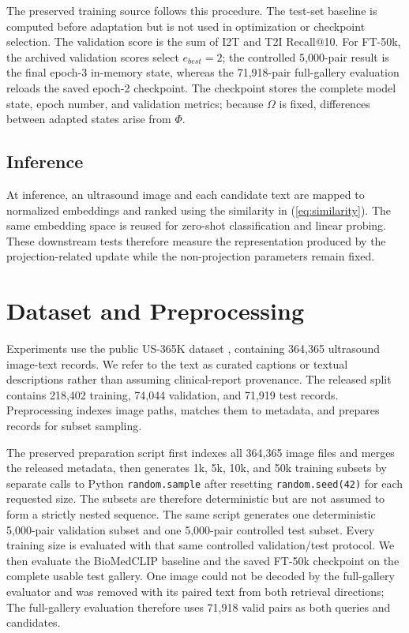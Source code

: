 \documentclass[runningheads]{llncs}
\begin{document}
The preserved training source follows this procedure. The test-set baseline is computed before adaptation but is not used in optimization or checkpoint selection. The validation score is the sum of I2T and T2I Recall@10. For FT-50k, the archived validation scores select $e_{best}=2$; the controlled 5,000-pair result is the final epoch-3 in-memory state, whereas the 71,918-pair full-gallery evaluation reloads the saved epoch-2 checkpoint. The checkpoint stores the complete model state, epoch number, and validation metrics; because $\Omega$ is fixed, differences between adapted states arise from $\Phi$.

\subsection{Inference}

At inference, an ultrasound image and each candidate text are mapped to normalized embeddings and ranked using the similarity in (\ref{eq:similarity}). The same embedding space is reused for zero-shot classification and linear probing. These downstream tests therefore measure the representation produced by the projection-related update while the non-projection parameters remain fixed.


\section{Dataset and Preprocessing}

Experiments use the public US-365K dataset \cite{jin2026usclip}, containing 364,365 ultrasound image-text records. We refer to the text as curated captions or textual descriptions rather than assuming clinical-report provenance. The released split contains 218,402 training, 74,044 validation, and 71,919 test records. Preprocessing indexes image paths, matches them to metadata, and prepares records for subset sampling.

The preserved preparation script first indexes all 364,365 image files and merges the released metadata, then generates 1k, 5k, 10k, and 50k training subsets by separate calls to Python \texttt{random.sample} after resetting \texttt{random.seed(42)} for each requested size. The subsets are therefore deterministic but are not assumed to form a strictly nested sequence. The same script generates one deterministic 5,000-pair validation subset and one 5,000-pair controlled test subset. Every training size is evaluated with that same controlled validation/test protocol. We then evaluate the BioMedCLIP baseline and the saved FT-50k checkpoint on the complete usable test gallery. One image could not be decoded by the full-gallery evaluator and was removed with its paired text from both retrieval directions; The full-gallery evaluation therefore uses 71,918 valid pairs as both queries and candidates.
\end{document}
